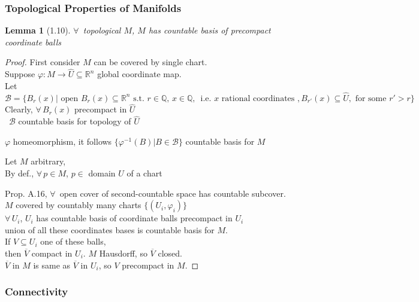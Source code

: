 \documentclass[11pt]{amsart}
\newtheorem{lemma}{Lemma}
\theoremstyle{definition}
\begin{document}
\subsubsection*{Topological Properties of Manifolds}

\begin{lemma}[1.10]
$\forall \, $ topological $M$, $M$ has countable basis of precompact coordinate balls
\end{lemma}

\begin{proof}
  First consider $M$ can be covered by single chart.  \\
Suppose $\varphi : M \to \widehat{U} \subseteq \mathbb{R}^n$ global coordinate map. \\
Let $\mathcal{B} = \lbrace B_r(x) | \text{ open } B_r(x) \subseteq \mathbb{R}^n \text{ s.t. } r\in \mathbb{Q}, \, x \in \mathbb{Q}, \, \text{ i.e. $x$ rational coordinates }, B_{r'}(x) \subseteq \widehat{U}, \text{ for some } r' > r \rbrace$ \\
Clearly, $\forall \, B_r(x)$ precompact in $\widehat{U}$ \\
\quad \, $\mathcal{B}$ countable basis for topology of $\widehat{U}$

$\varphi$ homeomorphism, it follows $\lbrace \varphi^{-1}(B) | B \in \mathcal{B} \rbrace$ countable basis for $M$

Let $M$ arbitrary, \\
\quad By def., $\forall \, p \in M$, $p \in $ domain $U$ of a chart

Prop. A.16, $\forall \, $ open cover of second-countable space has countable subcover. \\
\quad $M$ covered by countably many charts $\lbrace (U_i, \varphi_i) \rbrace$ \\
$\forall \, U_i$, $U_i$ has countable basis of coordinate balls precompact in $U_i$ \\
union of all these coordinates bases is countable basis for $M$.   \\

If $V \subseteq U_i$ one of these balls,  \\
\quad then $\overline{V}$ compact in $U_i$.  $M$ Hausdorff, so $\overline{V}$ closed.  \\
\quad $\overline{V}$ in $M$ is same as $\overline{V}$ in $U_i$, so $V$ precompact in $M$.
\end{proof}

\subsubsection*{Connectivity}
\end{document}
